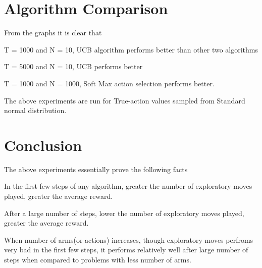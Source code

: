 \documentclass[a4paper,10pt]{report}
\newenvironment{my_itemize}{
\begin{itemize}
  \setlength{\itemsep}{1pt}
  \setlength{\parskip}{0pt}
  \setlength{\parsep}{0pt}}{
\end{itemize}}
\begin{document}
\section{Algorithm Comparison}
From the graphs it is clear that
\begin{my_itemize}
\item T = 1000 and N = 10, UCB algorithm performs better than other two algorithms
\item T = 5000 and N = 10, UCB performs better
\item T = 1000 and N = 1000, Soft Max action selection performs better.
\end{my_itemize}
The above experiments are run for  True-action values sampled from Standard normal distribution.

\section{Conclusion}
The above experiments essentially prove the following facts
\begin{my_itemize}
\item In the first few steps of any algorithm, greater the number of exploratory moves played, greater the average reward.
\item After a large number of steps, lower the number of exploratory moves played, greater the average reward.
\item When number of arms(or actions) increases, though exploratory moves perfroms very bad in the first few steps, it performs relatively well after large number of steps when compared to problems with less number of arms.
\end{my_itemize}
\end{document}
